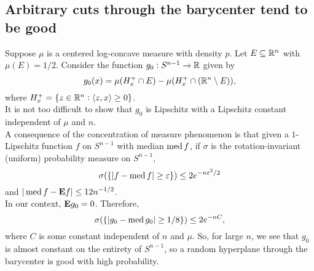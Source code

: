 \documentclass{article}
\begin{document}
	\subsection{Arbitrary cuts through the barycenter tend to be good}


		Suppose $\mu$ is a centered log-concave measure with density $p$. Let $E \subseteq \mathbb{R}^n$ with $\mu(E) = 1/2$. Consider the function $g_0 : S^{n-1} \to \mathbb{R}$ given by
		\[ g_0(x) = \mu(H_x^+ \cap E) - \mu(H_x^+ \cap (\mathbb{R}^n\setminus E)), \]
		where $H_x^+ = \{ z \in \mathbb{R}^n : \langle z , x \rangle \geq 0 \}$.\\
		It is not too difficult to show that $g_0$ is Lipschitz with a Lipschitz constant independent of $\mu$ and $n$.\\
		A consequence of the concentration of measure phenomenon is that given a $1$-Lipschitz function $f$ on $S^{n-1}$ with median $\operatorname{med} f$, if $\sigma$ is the rotation-invariant (uniform) probability measure on $S^{n-1}$,
		\[ \sigma ( \{ |f - \operatorname{med} f| \geq \varepsilon \} ) \leq 2e^{-n\varepsilon^2/2} \]
		and $|\operatorname{med} f - \textbf{E} f| \leq 12n^{-1/2}$.\\
		In our context, $\textbf{E} g_0 = 0$. Therefore,
		\[ \sigma ( \{ |g_0 - \operatorname{med} g_0| \geq 1/8 \} ) \leq 2e^{-nC}, \]
		where $C$ is some constant independent of $n$ and $\mu$. So, for large $n$, we see that $g_0$ is almost constant on the entirety of $S^{n-1}$, so a random hyperplane through the barycenter is good with high probability.\\



\end{document}
